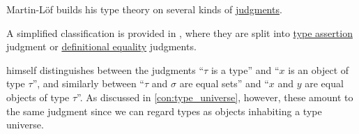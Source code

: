 \begin{remark}\label{rem:typing_judgments}
  Martin-L\"of builds his type theory on several kinds of \hyperref[con:judgment]{judgments}.

  A simplified classification is provided in \cite[19]{UnivalentFoundationsProgram2024OctoberHoTT}, where they are split into \hyperref[def:type_assertion]{type assertion} judgment or \hyperref[con:equality]{definitional equality} judgments.

   himself distinguishes between the judgments \enquote{\( \tau \) is a type} and \enquote{\( x \) is an object of type \( \tau \)}, and similarly between \enquote{\( \tau \) and \( \sigma \) are equal sets} and \enquote{\( x \) and \( y \) are equal objects of type \( \tau \)}. As discussed in \cref{con:type_universe}, however, these amount to the same judgment since we can regard types as objects inhabiting a type universe.
\end{remark}

